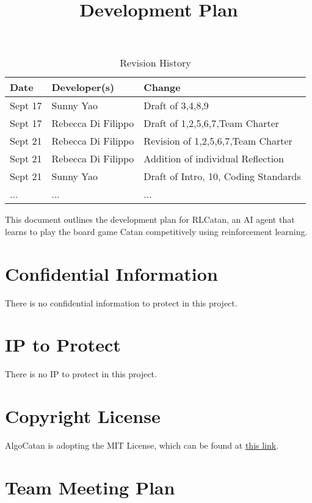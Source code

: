 \documentclass{article}
\title{Development Plan\\\progname}
\author{\authname}
\date{}
\begin{document}
\maketitle

\begin{table}[hp]
\caption{Revision History} \label{TblRevisionHistory}
\begin{tabularx}{\textwidth}{llX}
\toprule
\textbf{Date} & \textbf{Developer(s)} & \textbf{Change}\\
\midrule
Sept 17 & Sunny Yao & Draft of 3,4,8,9\\
Sept 17 & Rebecca Di Filippo & Draft of 1,2,5,6,7,Team Charter\\
Sept 21 & Rebecca Di Filippo & Revision of 1,2,5,6,7,Team Charter\\
Sept 21 & Rebecca Di Filippo & Addition of individual Reflection\\
Sept 21 & Sunny Yao & Draft of Intro, 10, Coding Standards\\
... & ... & ...\\
\bottomrule
\end{tabularx}
\end{table}

\newpage{}

\raggedright
This document outlines the development plan for RLCatan, an
AI agent that learns to play the board game Catan competitively 
using reinforcement learning. 

\section{Confidential Information}

\raggedright
There is no confidential information to protect in this project.

\section{IP to Protect}

\raggedright
There is no IP to protect in this project.

\section{Copyright License}

\raggedright{AlgoCatan is adopting the MIT License, which can be found at \href{https://github.com/SY3141/RLCatan/blob/main/LICENSE}{this link}.}

\section{Team Meeting Plan}
\end{document}
